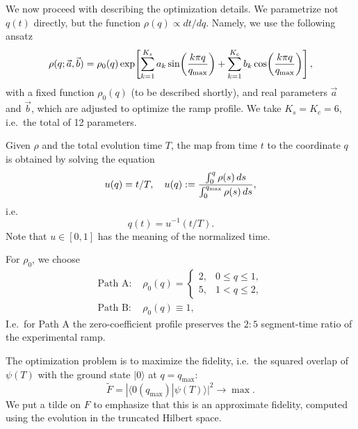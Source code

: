 \documentclass[a4paper,12pt]{article}
\theoremstyle{remark}
\theoremstyle{theorem}
\begin{document}
We now proceed with describing the optimization details. We parametrize not
$q (t)$ directly, but the function $\rho (q) \propto d t / d q$. Namely, we
use the following ansatz
\begin{equation}
	\rho (q ; \vec{a}, \vec{b}) = \rho_0 (q) \exp \hspace{-0.17em} \left[
	\sum_{k = 1}^{K_s} a_k \sin \hspace{-0.17em} \left( \frac{k \pi q}{q_{\max}}
	\right) + \sum_{k = 1}^{K_c} b_k \cos \hspace{-0.17em} \left( \frac{k \pi
		q}{q_{\max}} \right) \right], \label{eq:density}
\end{equation}
with a fixed function $\rho_0 (q)$ (to be described shortly), and real
parameters $\vec{a}$ and $\vec{b}$, which are adjusted to optimize the ramp
profile. We take $K_s = K_c = 6$, i.e.~the total of 12 parameters.

Given $\rho$ and the total evolution time $T$, the map from time $t$ to the
coordinate $q$ is obtained by solving the equation
\begin{equation}
	u (q) = t / T, \quad u (q) : = \frac{\int_0^q \rho (s) \hspace{0.17em} d
		s}{\int_0^{q_{\max}} \rho (s) \hspace{0.17em} d s}, \label{eq:clock1}
\end{equation}
i.e.
\begin{equation}
	q (t) = u^{- 1}  (t / T) . \qquad \label{eq:clock}
\end{equation}
Note that $u \in [0, 1]$ has the meaning of the normalized time.

For $\rho_0$, we choose
\begin{align}
	\text{Path A: } & \rho_0 (q) = \left\{\begin{array}{ll}
		2, & 0 \leq q \leq 1,\\
		5, & 1 < q \leq 2,
	\end{array}\right. \nonumber\\
	\text{Path B: } &\rho_0 (q) \equiv 1, \label{rho0B}
\end{align}
I.e.~for Path A the zero-coefficient profile preserves the $2 : 5$
segment-time ratio of the experimental ramp.

The optimization problem is to maximize the fidelity, i.e.~the squared overlap
of $\psi (T)$ with the ground state $|0 \rangle$ at $q = q_{\max}$:
\begin{equation}
	\tilde F  = | \langle 0 (q_{\max}) | \psi  (T) \rangle |^2 \rightarrow \max .
	\label{eq:f20}
\end{equation}
We put a tilde on $F$ to emphasize that this is an approximate fidelity, computed using the evolution in the truncated Hilbert space.
\end{document}
